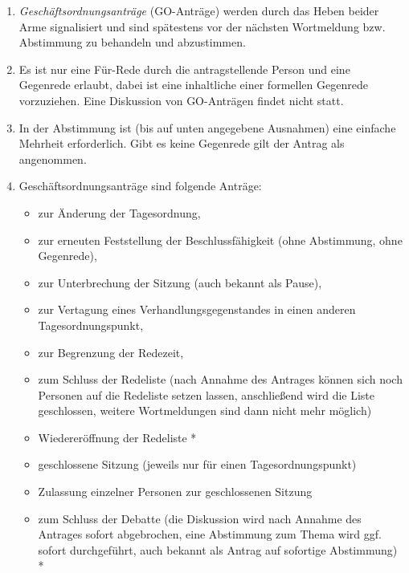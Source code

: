 \documentclass[12pt,oneside]{scrartcl}
\begin{document}
\begin{enumerate}
\item \emph{Geschäftsordnungsanträge} (GO-Anträge) werden durch das Heben
beider Arme signalisiert und sind spätestens vor der nächsten Wortmeldung
bzw. Abstimmung zu behandeln und abzustimmen.

\item Es ist nur eine Für-Rede durch die antragstellende Person und eine Gegenrede
erlaubt, dabei ist eine inhaltliche einer formellen Gegenrede vorzuziehen.
Eine Diskussion von GO-Anträgen findet nicht statt.

\item In der Abstimmung ist (bis auf unten angegebene Ausnahmen) eine einfache
Mehrheit erforderlich.
Gibt es keine Gegenrede gilt der Antrag als angenommen.

\item Geschäftsordnungsanträge sind folgende Anträge:

\begin{itemize}
\item zur Änderung der Tagesordnung,

\item zur erneuten Feststellung der Beschlussfähigkeit
(ohne Abstimmung, ohne Gegenrede),

\item zur Unterbrechung der Sitzung (auch bekannt als \textquotedbl{}Pause\textquotedbl{}),

\item zur Vertagung eines Verhandlungsgegenstandes in einen anderen
Tagesordnungspunkt,

\item zur Begrenzung der Redezeit,

\item zum Schluss der Redeliste (nach Annahme des Antrages können sich noch
Personen auf die Redeliste setzen lassen, anschließend wird die Liste
geschlossen, weitere Wortmeldungen sind dann nicht mehr möglich)

\item Wiedereröffnung der Redeliste *

\item geschlossene Sitzung (jeweils nur für einen Tagesordnungspunkt)

\item Zulassung einzelner Personen zur geschlossenen Sitzung

\item zum Schluss der Debatte (die Diskussion wird nach Annahme des
Antrages sofort abgebrochen, eine Abstimmung zum Thema wird ggf.
sofort durchgeführt, auch bekannt als \textquotedbl{}Antrag auf sofortige Abstimmung\textquotedbl{}) *


\end{itemize}
\end{enumerate}
\end{document}
